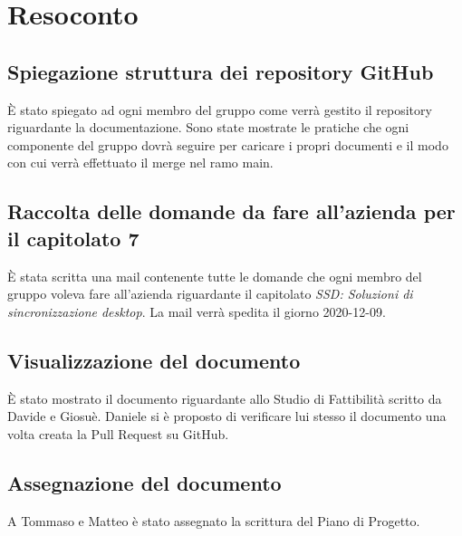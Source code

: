 \newpage


\section{Resoconto}

\subsection{Spiegazione struttura dei repository GitHub}

È stato spiegato ad ogni membro del gruppo come verrà gestito il repository riguardante la documentazione. Sono state mostrate le pratiche che ogni componente del gruppo dovrà seguire per caricare i propri documenti e il modo con cui verrà effettuato il merge nel ramo main.

\subsection{Raccolta delle domande da fare all'azienda per il capitolato 7}

È stata scritta una mail contenente tutte le domande che ogni membro del gruppo voleva fare all'azienda riguardante il capitolato \textit{SSD: Soluzioni di sincronizzazione desktop}.
La mail verrà spedita il giorno 2020-12-09.

\subsection{Visualizzazione del documento \SdF{}}

È stato mostrato il documento riguardante allo Studio di Fattibilità scritto da Davide e Giosuè. Daniele si è proposto di verificare lui stesso il documento una volta creata la Pull Request su GitHub.

\subsection{Assegnazione del documento \PdP{}}

A Tommaso e Matteo è stato assegnato la scrittura del Piano di Progetto.

\newpage

